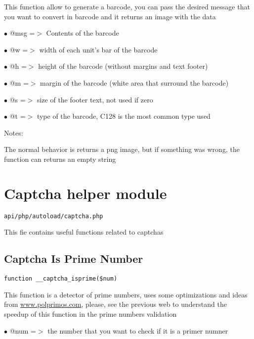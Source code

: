 \documentclass[a4paper]{book}
\def\htmladdnormallink#1#2{\href{#2}{#1}}
\begin{document}
This function allow to generate a barcode, you can pass the desired
message that you want to convert in barcode and it returns an image
with the data

\begin{compactitem}
\item[\color{myblue}$\bullet$] @msg =$>$ Contents of the barcode
\item[\color{myblue}$\bullet$] @w   =$>$ width of each unit's bar of the barcode
\item[\color{myblue}$\bullet$] @h   =$>$ height of the barcode (without margins and text footer)
\item[\color{myblue}$\bullet$] @m   =$>$ margin of the barcode (white area that surround the barcode)
\item[\color{myblue}$\bullet$] @s   =$>$ size of the footer text, not used if zero
\item[\color{myblue}$\bullet$] @t   =$>$ type of the barcode, C128 is the most common type used
\end{compactitem}

Notes:

The normal behavior is returns a png image, but if something was wrong,
the function can returns an empty string

\hypertarget{toc44}{}
\section{Captcha helper module}

\begin{lstlisting}
api/php/autoload/captcha.php
\end{lstlisting}

This fie contains useful functions related to captchas

\hypertarget{toc45}{}
\subsection{Captcha Is Prime Number}

\begin{lstlisting}
function __captcha_isprime($num)
\end{lstlisting}

This function is a detector of prime numbers, uses some optimizations and
ideas from \htmladdnormallink{www.polprimos.com}{www.polprimos.com}, please, see the previous web to understand
the speedup of this function in the prime numbers validation

\begin{compactitem}
\item[\color{myblue}$\bullet$] @num =$>$ the number that you want to check if it is a primer numner
\end{compactitem}
\end{document}
